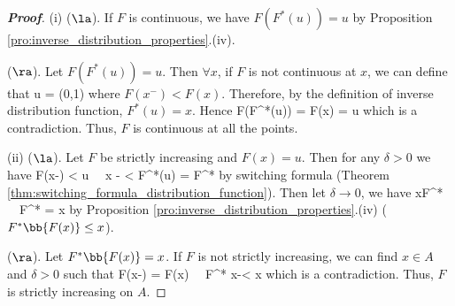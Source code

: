 \begin{proof}[\bf Proof]
\ben
\item [(i)] ($\la$). If $F$ is continuous, we have $F(F^*(u)) = u$ by Proposition \ref{pro:inverse_distribution_properties}.(iv).


($\ra$). Let $F(F^*(u)) = u$. Then $\forall x$, if $F$ is not continuous at $x$, we can define that
\be
u =   \in (0,1)
\ee
where $F(x^-)< F(x)$. Therefore, by the definition of inverse distribution function, $F^*(u) =x$. Hence
\be
F(F^*(u)) = F(x) \neq{}  = u
\ee
which is a contradiction. Thus, $F$ is continuous at all the points.

\item [(ii)] ($\la$). Let $F$ be strictly increasing and $F(x) = u$. Then for any $\delta>0$ we have
\be
F(x-\delta) < u \ \ra\ x - \delta < F^*(u) = F^*
\ee
by switching formula (Theorem \ref{thm:switching_formula_distribution_function}). Then let $\delta \to 0$, we have
\be
x\leq F^* \ \ra\ F^* = x
\ee
by Proposition \ref{pro:inverse_distribution_properties}.(iv) ($F^*\bb{F(x)} \leq x$).

($\ra$). Let $F^*\bb{F(x)} = x$. If $F$ is not strictly increasing, we can find $x\in A$ and $\delta>0$ such that
\be
F(x-\delta) = F(x) \ \ra\ F^* \leq x-\delta < x
\ee
which is a contradiction. Thus, $F$ is strictly increasing on $A$.
\een
\end{proof}


%
%
%






